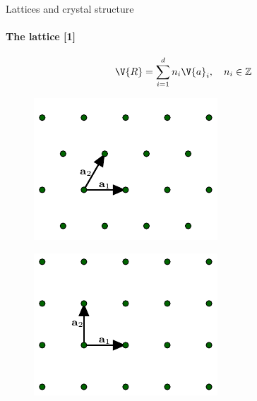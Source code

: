 \documentclass{beamer}
\begin{document}
\begin{frame}{Lattices and crystal structure}
\framesubtitle{The lattice [1]}
\begin{equation*}
\V{R} = \sum_{i = 1}^{d} n_i \V{a}_i, \quad n_i \in \mathbb{Z}
\end{equation*}
\begin{figure}[H]
	\centering
	\begin{minipage}{.4\textwidth}
		\centering
		\includegraphics[width=\linewidth]{figures/triangular.pdf}
		\label{fig:triangular_lattice}
	\end{minipage}%
	\hfill
	\begin{minipage}{.4\textwidth}
		\centering
		\includegraphics[width=\linewidth]{figures/square.pdf}
		\label{fig:square_lattice}
	\end{minipage}
\end{figure}
\end{frame}
\end{document}
